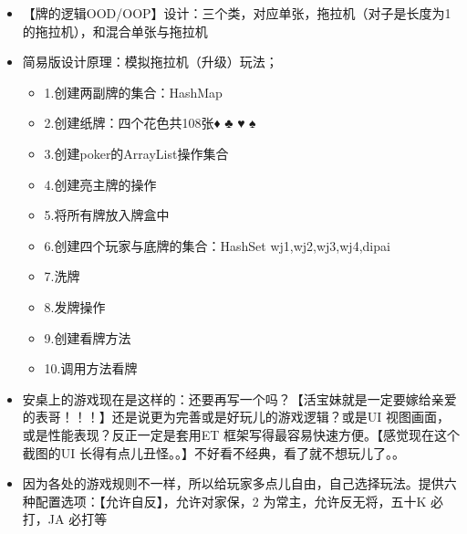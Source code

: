 \documentclass[9pt, b5paper]{article}
\begin{document}
\begin{itemize}
\item 【牌的逻辑OOD/OOP】设计：三个类，对应单张，拖拉机（对子是长度为1 的拖拉机），和混合单张与拖拉机
\item 简易版设计原理：模拟拖拉机（升级）玩法；
\begin{itemize}
\item 1.创建两副牌的集合：HashMap
\item 2.创建纸牌：四个花色共108张♦ ♣ ♥ ♠
\item 3.创建poker的ArrayList操作集合
\item 4.创建亮主牌的操作
\item 5.将所有牌放入牌盒中
\item 6.创建四个玩家与底牌的集合：HashSet wj1,wj2,wj3,wj4,dipai
\item 7.洗牌
\item 8.发牌操作
\item 9.创建看牌方法
\item 10.调用方法看牌
\end{itemize}
\item 安桌上的游戏现在是这样的：还要再写一个吗？【活宝妹就是一定要嫁给亲爱的表哥！！！】还是说更为完善或是好玩儿的游戏逻辑？或是UI 视图画面，或是性能表现？反正一定是套用ET 框架写得最容易快速方便。【感觉现在这个截图的UI 长得有点儿丑怪。。】不好看不经典，看了就不想玩儿了。。
\item 因为各处的游戏规则不一样，所以给玩家多点儿自由，自己选择玩法。提供六种配置选项：【允许自反】，允许对家保，2 为常主，允许反无将，五十K 必打，JA 必打等
\end{itemize}
\end{document}
